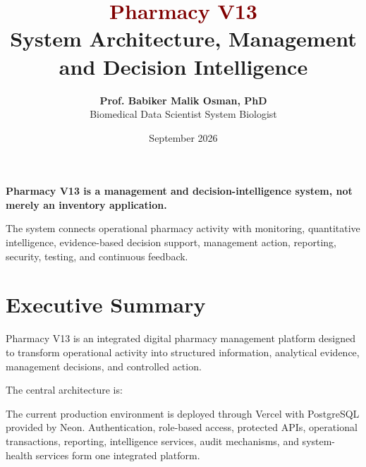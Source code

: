 \documentclass[12pt,a4paper]{article}
\title{
\textcolor{maroon}{\Huge\textbf{Pharmacy V13}}\\[5pt]
\Large System Architecture, Management and Decision Intelligence
}
\author{
\textbf{Prof. Babiker Malik Osman, PhD}\\
Biomedical Data Scientist \;\textbullet\; System Biologist
}
\date{September 2026}
\begin{document}
\maketitle
\thispagestyle{empty}

\begin{keybox}
\textbf{Pharmacy V13 is a management and decision-intelligence system, not merely an inventory application.}

The system connects operational pharmacy activity with monitoring, quantitative intelligence, evidence-based decision support, management action, reporting, security, testing, and continuous feedback.
\end{keybox}

\section*{Executive Summary}

Pharmacy V13 is an integrated digital pharmacy management platform designed to transform operational activity into structured information, analytical evidence, management decisions, and controlled action.

The central architecture is:

\begin{center}
\end{center}

The current production environment is deployed through Vercel with PostgreSQL provided by Neon. Authentication, role-based access, protected APIs, operational transactions, reporting, intelligence services, audit mechanisms, and system-health services form one integrated platform.
\end{document}
